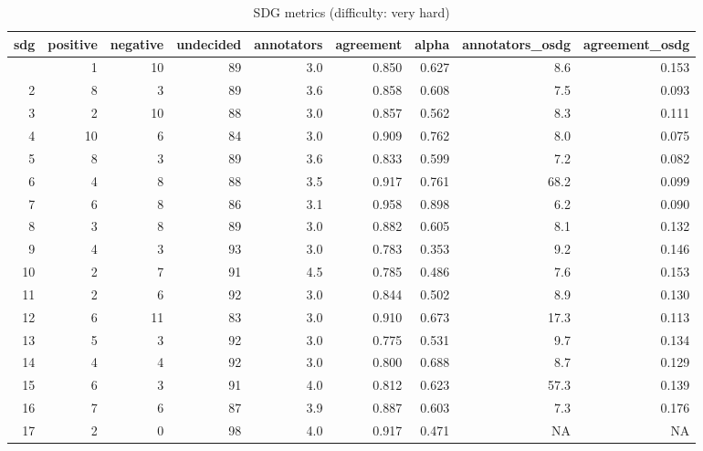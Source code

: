 \begin{table}[t]
\caption*{
{\large SDG metrics (difficulty: very hard)}
} 
\fontsize{12.0pt}{14.4pt}\selectfont
\begin{tabular*}{\linewidth}{@{\extracolsep{\fill}}rrrrrrrrr}
\toprule
sdg & positive & negative & undecided & annotators & agreement & alpha & annotators\_osdg & agreement\_osdg \\ 
\midrule\addlinespace[2.5pt]
1 & 1 & 10 & 89 & 3.0 & 0.850 & 0.627 & 8.6 & 0.153 \\ 
2 & 8 & 3 & 89 & 3.6 & 0.858 & 0.608 & 7.5 & 0.093 \\ 
3 & 2 & 10 & 88 & 3.0 & 0.857 & 0.562 & 8.3 & 0.111 \\ 
4 & 10 & 6 & 84 & 3.0 & 0.909 & 0.762 & 8.0 & 0.075 \\ 
5 & 8 & 3 & 89 & 3.6 & 0.833 & 0.599 & 7.2 & 0.082 \\ 
6 & 4 & 8 & 88 & 3.5 & 0.917 & 0.761 & 68.2 & 0.099 \\ 
7 & 6 & 8 & 86 & 3.1 & 0.958 & 0.898 & 6.2 & 0.090 \\ 
8 & 3 & 8 & 89 & 3.0 & 0.882 & 0.605 & 8.1 & 0.132 \\ 
9 & 4 & 3 & 93 & 3.0 & 0.783 & 0.353 & 9.2 & 0.146 \\ 
10 & 2 & 7 & 91 & 4.5 & 0.785 & 0.486 & 7.6 & 0.153 \\ 
11 & 2 & 6 & 92 & 3.0 & 0.844 & 0.502 & 8.9 & 0.130 \\ 
12 & 6 & 11 & 83 & 3.0 & 0.910 & 0.673 & 17.3 & 0.113 \\ 
13 & 5 & 3 & 92 & 3.0 & 0.775 & 0.531 & 9.7 & 0.134 \\ 
14 & 4 & 4 & 92 & 3.0 & 0.800 & 0.688 & 8.7 & 0.129 \\ 
15 & 6 & 3 & 91 & 4.0 & 0.812 & 0.623 & 57.3 & 0.139 \\ 
16 & 7 & 6 & 87 & 3.9 & 0.887 & 0.603 & 7.3 & 0.176 \\ 
17 & 2 & 0 & 98 & 4.0 & 0.917 & 0.471 & NA & NA \\ 
\bottomrule
\end{tabular*}
\end{table}

